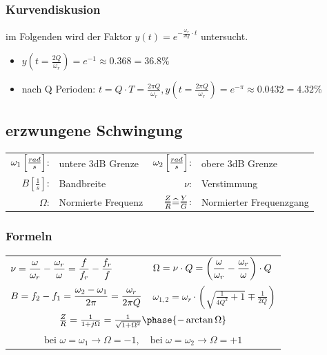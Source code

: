 \documentclass{article}
\begin{document}
\begin{twocolumn}
\subsubsection{Kurvendiskusion}
im Folgenden wird der Faktor $y(t) = e^{-\frac{\omega_r}{2 Q}\cdot t}$ untersucht. 
\begin{itemize}
  \item $y(t = \frac{2Q}{\omega_r}) = e^{-1} \approx 0.368 = 36.8\%$
  \item nach Q Perioden: $t = Q \cdot T = \frac{2 \pi Q}{\omega_r}, y(t=\frac{2\pi
  Q}{\omega_r}) = e^{-\pi} \approx 0.0432 = 4.32\%$
\end{itemize}

\subsection{erzwungene Schwingung}
\begin{definition}
  \begin{tabular}{rl|rl}
    $\omega_1 \left[\frac{rad}{s}\right]$: & untere 3dB Grenze &
    $\omega_2 \left[\frac{rad}{s}\right]$: & obere 3dB Grenze \\ 
    $B \left[ \frac{1}{s} \right]$: & Bandbreite &
    $\nu$: & Verstimmung \\
    $\Omega$: & Normierte Frequenz &
    $\frac{\underline{Z}}{R} \widehat{=} \frac{\underline{Y}}{G}$: & Normierter Frequenzgang \\
  \end{tabular}
\end{definition}

\subsubsection{Formeln}

\begin{tabularx}{\columnwidth}{YY}
  $\displaystyle \nu = \frac{\omega}{\omega_r} - \frac{\omega_r}{\omega} = \frac{f}{f_r} -
  \frac{f_r}{f}$ &
  $\displaystyle \Omega = \nu \cdot Q = \left( \frac{\omega}{\omega_r} - \frac{\omega_r}{\omega}
  \right) \cdot Q$ \\
  $\displaystyle B = f_2 - f_1 = \frac{\omega_2 - \omega_1}{2\pi} = \frac{\omega_r}{2\pi Q}$ &
  $\omega_{1,2} = \omega_r \cdot \left(\sqrt{\frac{1}{4Q^2}+1} \mp \frac{1}{2Q}\right)$ \\
   \\
   \\ \hline
\end{tabularx}


\end{twocolumn}
\end{document}
